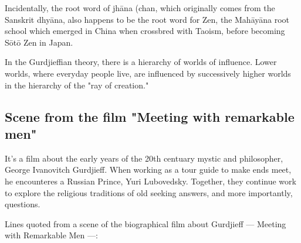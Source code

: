 Incidentally, the root word of jhāna (chan, which originally comes from the Sanskrit dhyāna,  also happens to be the root word for Zen, the Mahāyāna root school which emerged in China when crossbred with Taoism, before becoming Sōtō Zen in Japan.

In the Gurdjieffian theory, there is a hierarchy of worlds of influence. Lower worlds, where everyday people live, are influenced by successively higher worlds in the hierarchy of the "ray of creation." 




\subsection*{Scene from the film "Meeting with remarkable men"}

It's a film about the early years of the 20th centuary mystic and philosopher,  George Ivanovitch Gurdjieff.  When working as a tour guide to make ends meet, he encounteres a Russian Prince, Yuri Lubovedsky.  Together, they continue work to explore the religious traditions of old seeking answers,  and more importantly,  questions.    

Lines quoted from a scene of the biographical film about Gurdjieff --- Meeting with Remarkable Men ---:\\

